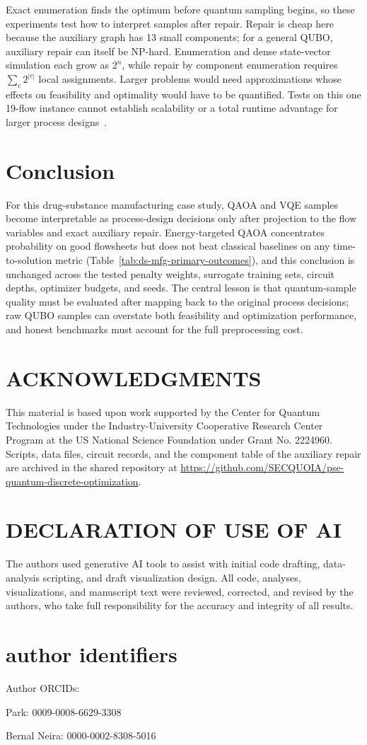 \documentclass[10pt,letterpaper]{article}
\begin{document}
Exact enumeration finds the optimum before quantum sampling begins, so these experiments test how to interpret samples after repair.
Repair is cheap here because the auxiliary graph has 13 small components; for a general QUBO, auxiliary repair can itself be NP-hard.
Enumeration and dense state-vector simulation each grow as $2^n$, while repair by component enumeration requires $\sum_c 2^{|c|}$ local assignments.
Larger problems would need approximations whose effects on feasibility and optimality would have to be quantified.
Tests on this one 19-flow instance cannot establish scalability or a total runtime advantage for larger process designs~\cite{Abbas2024}.

\FloatBarrier
\section{Conclusion}
\label{sec:ds-mfg-conclusion}

For this drug-substance manufacturing case study, QAOA and VQE samples become interpretable as process-design decisions only after projection to the flow variables and exact auxiliary repair.
Energy-targeted QAOA concentrates probability on good flowsheets but does not beat classical baselines on any time-to-solution metric (Table~\ref{tab:ds-mfg-primary-outcomes}), and this conclusion is unchanged across the tested penalty weights, surrogate training sets, circuit depths, optimizer budgets, and seeds.
The central lesson is that quantum-sample quality must be evaluated after mapping back to the original process decisions; raw QUBO samples can overstate both feasibility and optimization performance, and honest benchmarks must account for the full preprocessing cost.

\section{ACKNOWLEDGMENTS}
This material is based upon work supported by the Center for Quantum Technologies under the Industry-University Cooperative Research Center Program at the US National Science Foundation under Grant No. 2224960.
Scripts, data files, circuit records, and the component table of the auxiliary repair are archived in the shared repository at \url{https://github.com/SECQUOIA/pse-quantum-discrete-optimization}.

\section{DECLARATION OF USE OF AI}
The authors used generative AI tools to assist with initial code drafting, data-analysis scripting, and draft visualization design. All code, analyses, visualizations, and manuscript text were reviewed, corrected, and revised by the authors, who take full responsibility for the accuracy and integrity of all results.

\section{author identifiers}
Author ORCIDs:

Park: 0009-0008-6629-3308

Bernal Neira: 0000-0002-8308-5016


\pseprintreferences
\pseprintcopyright
\end{document}
